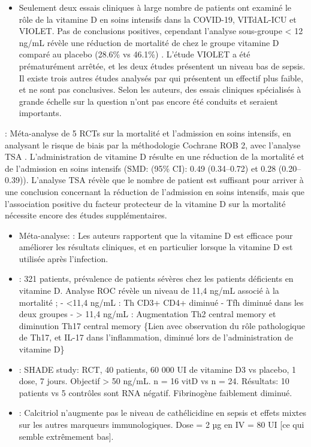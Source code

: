 \documentclass[
  a4paper,
  DIV=11,
  numbers=noendperiod,
  listof=totoc]{scrreprt}
\providecommand{\tightlist}{%
  \setlength{\itemsep}{0pt}\setlength{\parskip}{0pt}}\usepackage{longtable,booktabs,array}
\begin{document}
\begin{itemize}
\tightlist
\item
  Seulement deux essais cliniques à large nombre de patients ont examiné
  le rôle de la vitamine D en soins intensifs dans la COVID-19,
  VITdAL-ICU et VIOLET. Pas de conclusions positives, cependant
  l'analyse sous-groupe \textless{} 12 ng/mL révèle une réduction de
  mortalité de chez le groupe vitamine D comparé au placebo (28.6\% vs
  46.1\%) \autocite{Cutuli.2024}. L'étude VIOLET a été prématurément
  arrêtée, et les deux études présentent un niveau bas de sepsis. Il
  existe trois autres études analysés par \textcite{Cutuli.2024} qui
  présentent un effectif plus faible, et ne sont pas conclusives. Selon
  les auteurs, des essais cliniques spécialisés à grande échelle sur la
  question n'ont pas encore été conduits et seraient importants.
\end{itemize}

\textcite{Argano.2023}: Méta-analyse de 5 \acp{RCT} sur la mortalité et
l'admission en soins intensifs, en analysant le risque de biais par la
méthodologie Cochrane ROB 2, avec l'analyse \ac{TSA}
\autocite{Kang.2021}. L'administration de vitamine D résulte en une
réduction de la mortalité et de l'admission en soins intensifs (SMD:
(95\% CI): 0.49 (0.34--0.72) et 0.28 (0.20--0.39)). L'analyse TSA révèle
que le nombre de patient est suffisant pour arriver à une conclusion
concernant la réduction de l'admission en soins intensifs, mais que
l'association positive du facteur protecteur de la vitamine D sur la
mortalité nécessite encore des études supplémentaires.

\begin{itemize}
\item
  Méta-analyse: \textcite{Pal.2022} : Les auteurs rapportent que la
  vitamine D est efficace pour améliorer les résultats cliniques, et en
  particulier lorsque la vitamine D est utilisée après l'infection.
\item
  \textcite{Karonova.2022.pharmaceuticals}: 321 patients, prévalence de
  patients sévères chez les patients déficients en vitamine D. Analyse
  ROC révèle un niveau de 11,4 ng/mL associé à la mortalité ; -
  \textless11,4 ng/mL : Th CD3+ CD4+ diminué - Tfh diminué dans les deux
  groupes - \textgreater{} 11,4 ng/mL : Augmentation Th2 central memory
  et diminution Th17 central memory \{Lien avec observation du rôle
  pathologique de Th17, et IL-17 dans l'inflammation, diminué lors de
  l'administration de vitamine D\} \autocites[ ]{Pacha.2020}[
  ]{Raucci.2020}[ ]{Gilani.2022}{Cutuli.2024}
\item
  \textcite{Rastogi.2022} : SHADE study: RCT, 40 patients, 60 000 UI de
  vitamine D3 vs placebo, 1 dose, 7 jours. Objectif \textgreater{} 50
  ng/mL. n = 16 vitD vs n = 24. Résultats: 10 patients vs 5 contrôles
  sont RNA négatif. Fibrinogène faiblement diminué.
\item
  \textcite{Leaf.2014} : Calcitriol n'augmente pas le niveau de
  cathélicidine en sepsis et effets mixtes sur les autres marqueurs
  immunologiques. Dose = 2 µg en IV = 80 UI {[}ce qui semble extrêmement
  bas{]}.
\end{itemize}
\end{document}
